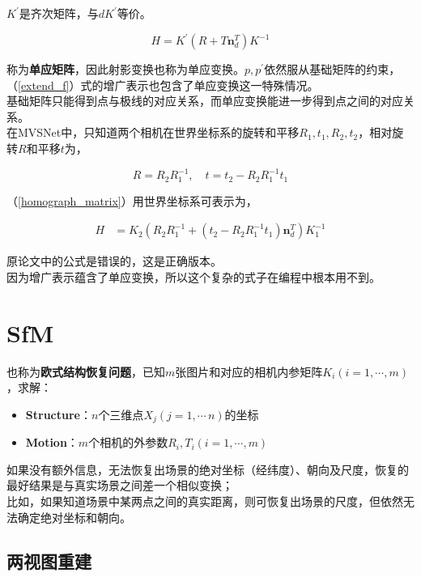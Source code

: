 	$K^\prime$是齐次矩阵，与$dK^\prime$等价。

	\begin{equation}
		H= K^{\prime}\left(R + T\mathbf{n}_d^T\right)K^{-1} \label{homograph_matrix}
	\end{equation}

	称为\textbf{单应矩阵}，因此射影变换也称为单应变换。$p,p^{\prime}$依然服从基础矩阵的约束，（\ref{extend_f}）式的增广表示也包含了单应变换这一特殊情况。\\

	基础矩阵只能得到点与极线的对应关系，而单应变换能进一步得到点之间的对应关系。\\

	在MVSNet中，只知道两个相机在世界坐标系的旋转和平移$R_1,t_1,R_2, t_2$，相对旋转$R$和平移$t$为，

	$$
		R = R_2R_1^{-1},\quad 
		t = t_2 - R_2R_1^{-1}t_1
	$$

	（\ref{homograph_matrix}）用世界坐标系可表示为，

	\begin{align}
		H &= K_2 \left(R_2R_1^{-1} +\left(t_2 - R_2R_1^{-1}t_1\right) \mathbf{n}_d^T\right) K_1^{-1} \label{new_homograph_matrix}
	\end{align}	

	原论文中的公式是错误的，这是正确版本。\\

	因为增广表示蕴含了单应变换，所以这个复杂的式子在编程中根本用不到。

\section{SfM}
	 也称为\textbf{欧式结构恢复问题}，已知$m$张图片和对应的相机内参矩阵$K_i(i=1,\cdots,m)$，求解：
	\begin{itemize}
		\item \textbf{Structure}：$n$个三维点$X_j(j=1,\cdots\,n)$的坐标
		\item \textbf{Motion}：$m$个相机的外参数$R_i,T_i(i=1,\cdots,m)$
	\end{itemize}		
	
	如果没有额外信息，无法恢复出场景的绝对坐标（经纬度）、朝向及尺度，恢复的最好结果是与真实场景之间差一个相似变换；\\

	比如，如果知道场景中某两点之间的真实距离，则可恢复出场景的尺度，但依然无法确定绝对坐标和朝向。

	\subsection{两视图重建}

